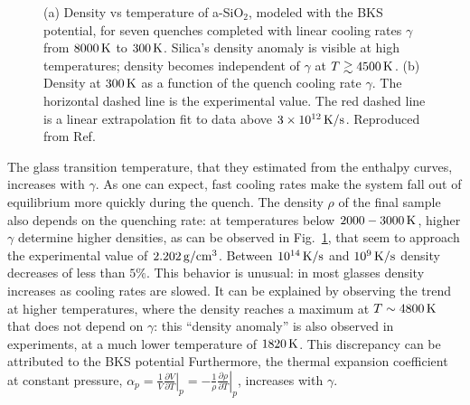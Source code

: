 \begin{figure}[!tb]
    \centering
    \hfill
    \caption{
    (a) Density vs temperature of a-SiO$_2$, modeled with the BKS potential, for seven quenches completed with linear cooling rates $\gamma$ from $8000\,\mathrm{K}$ to $300\,\mathrm{K}$. Silica's density anomaly is visible at high temperatures; density becomes independent of $\gamma$ at $T \gtrsim 4500\,\mathrm{K}$. 
    (b) Density at $300\,\mathrm{K}$ as a function of the quench cooling rate $\gamma$. The horizontal dashed line is the experimental value. The red dashed line is a linear extrapolation fit to data above $3\times 10^{12}\,\mathrm{K/s}$. 
    Reproduced from Ref.~\cite{Lane2015}}
    \label{fig:silica-bks-density}
\end{figure}

The glass transition temperature, that they estimated from the enthalpy curves, increases with $\gamma$. As one can expect, fast cooling rates make the system fall out of equilibrium more quickly during the quench. 
The density $\rho$ of the final sample also depends on the quenching rate: at temperatures below $2000-3000\,\mathrm{K}$, higher $\gamma$ determine higher densities, as can be observed in Fig.~\ref{fig:silica-bks-density}, that seem to approach the experimental value of $2.202\,\mathrm{g/cm^3}$. Between $10^{14}\,\mathrm{K/s}$ and $10^{9}\,\mathrm{K/s}$ density decreases of less than $5\%$. 
This behavior is unusual: in most glasses density increases as cooling rates are slowed. It can be explained by observing the trend at higher temperatures, where the density reaches a maximum at $T\sim 4800\,\mathrm{K}$ that does not depend on $\gamma$: this ``density anomaly'' is also observed in experiments, at a much lower temperature of $1820\,\mathrm{K}$. This discrepancy can be attributed to the BKS potential   
Furthermore, the thermal expansion coefficient at constant pressure, $\alpha_p = \frac{1}{V} \left.\frac{\partial V}{\partial T}\right|_p = -\frac{1}{\rho} \left.\frac{\partial \rho}{\partial T}\right|_p$, increases with $\gamma$.

